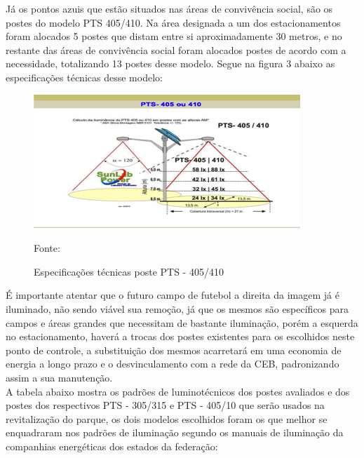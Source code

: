 J\'a os pontos azuis que est\~ao situados nas \'areas de conviv\^encia social, s\~ao os postes do modelo PTS 405/410. Na \'area designada a um dos estacionamentos foram alocados 5 postes que distam entre si aproximadamente 30 metros, e no restante das \'areas de conviv\^encia social foram alocados postes de acordo com a necessidade, totalizando 13 postes desse modelo. Segue na figura 3 abaixo as especifica\c{c}\~oes t\'ecnicas desse modelo:

\begin{figure}[H]
	 \centering
	\label{PTS405}
	 \includegraphics[keepaspectratio=true,scale=0.8]{figuras/PTS405.png}
	 \caption{Especifica\c{c}\~oes t\'ecnicas poste PTS - 405/410}
	 \small{Fonte: \cite{SUNLABPTS}}
\end{figure}

É importante atentar que o futuro campo de futebol a direita da imagem j\'a \'e iluminado, n\~ao sendo vi\'avel sua remo\c{c}\~ao, j\'a que os mesmos s\~ao espec\'ificos para campos e \'areas grandes que necessitam de bastante ilumina\c{c}\~ao, por\'em a esquerda no estacionamento, haver\'a a trocas dos postes existentes para os escolhidos neste ponto de controle, a substitui\c{c}\~ao dos mesmos acarretar\'a em uma economia de energia a longo prazo e o desvinculamento com a rede da CEB, padronizando assim a sua manuten\c{c}\~ao. \\ A tabela abaixo mostra os padr\~oes de luminot\'ecnicos dos postes avaliados e dos postes dos respectivos PTS - 305/315 e PTS - 405/10 que ser\~ao usados na revitaliza\c{c}\~ao do parque, os dois modelos escolhidos foram os que melhor se enquadraram nos padr\~oes de ilumina\c{c}\~ao segundo os manuais de ilumina\c{c}\~ao da companhias energ\'eticas dos estados da federa\c{c}\~ao:

